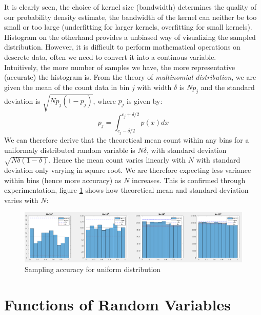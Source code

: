 \documentclass{article}
\begin{document}
It is clearly seen, the choice of kernel size (bandwidth) determines the quality of our probability density estimate, the bandwidth of the kernel can neither be too small or too large (underfitting for larger kernels, overfitting for small kernels). Histogram on the otherhand provides a unbiased way of visualizing the sampled distribution. However, it is difficult to perform mathematical operations on descrete data, often we need to convert it into a continous variable.\\
Intuitively, the more number of samples we have, the more representative (accurate) the histogram is. From the theory of \textit{multinomial distribution}, we are given the mean of the count data in bin $j$ with width $\delta$ is $Np_j$ and the standard deviation is $\sqrt{Np_j(1-p_j)}$, where $p_j$ is given by:
$$
p_j = \int_{c_j-\delta/2}^{c_j+\delta/2}p(x)dx
$$
We can therefore derive that the theoretical mean count within any bins for a uniformaly distributed random variable is $N\delta$, with standard deviation $\sqrt{N\delta(1-\delta)}$. Hence the mean count varies linearly with $N$ with standard deviation only varying in square root. We are therefore expecting less variance within bins (hence more accuracy) as $N$ increases. This is confirmed through experimentation, figure \ref{fig:bins} shows how theoretical mean and standard deviation varies with $N$:
\begin{figure}[htp]
	\centering
	\includegraphics[width=\linewidth]{task_1_2.png}
	\caption{Sampling accuracy for uniform distribution}
	\label{fig:bins}
\end{figure}

\section{Functions of Random Variables}
\newcommand\given[1][]{\:#1\vert\:}
\end{document}

